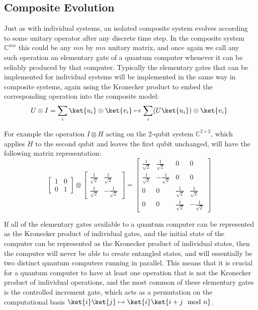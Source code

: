 \subsection{Composite Evolution}
Just as with individual systems, an isolated composite system evolves according to some unitary operator after any discrete time step. In the composite system $\mathbb{C}^{mn}$ this could be any $mn$ by $mn$ unitary matrix, and once again we call any such operation an elementary gate of a quantum computer whenever it can be reliably produced by that computer. Typically the elementary gates that can be implemented for individual systems will be implemented in the same way in composite systems, again using the Kronecker product to embed the corresponding operation into the composite model:
\[U \otimes I = \sum_i \ket{u_i}\otimes\ket{v_i} \mapsto \sum_i (U\ket{u_i})\otimes \ket{v_i}\]

For example the operation $I \otimes H$ acting on the 2-qubit system $\mathbb{C}^{2\times 2}$, which applies $H$ to the second qubit and leaves the first qubit unchanged, will have the following matrix representation:
\[
\left[\begin{matrix}
	1&0\\
	0&1
\end{matrix}\right]
\otimes
\left[\begin{matrix}
	\frac{1}{\sqrt{2}}&\frac{1}{\sqrt{2}}\\
	\frac{1}{\sqrt{2}}&-\frac{1}{\sqrt{2}}
\end{matrix}\right]
=
\left[\begin{matrix}
	\frac{1}{\sqrt{2}}&\frac{1}{\sqrt{2}}&0&0\\
	\frac{1}{\sqrt{2}}&-\frac{1}{\sqrt{2}}&0&0\\
	0&0&\frac{1}{\sqrt{2}}&\frac{1}{\sqrt{2}}\\
	0&0&\frac{1}{\sqrt{2}}&-\frac{1}{\sqrt{2}}
\end{matrix}\right]
\]

If all of the elementary gates available to a quantum computer can be represented as the Kronecker product of individual gates, and the initial state of the computer can be represented as the Kronecker product of individual states, then the computer will never be able to create entangled states, and will essentially be two distinct quantum computers running in parallel. This means that it is crucial for a quantum computer to have at least one operation that is not the Kronecker product of individual operations, and the most common of these elementary gates is the controlled increment gate, which acts as a permutation on the computational basis $\ket{i}\ket{j} \mapsto \ket{i}\ket{i+j \mod n}$.

